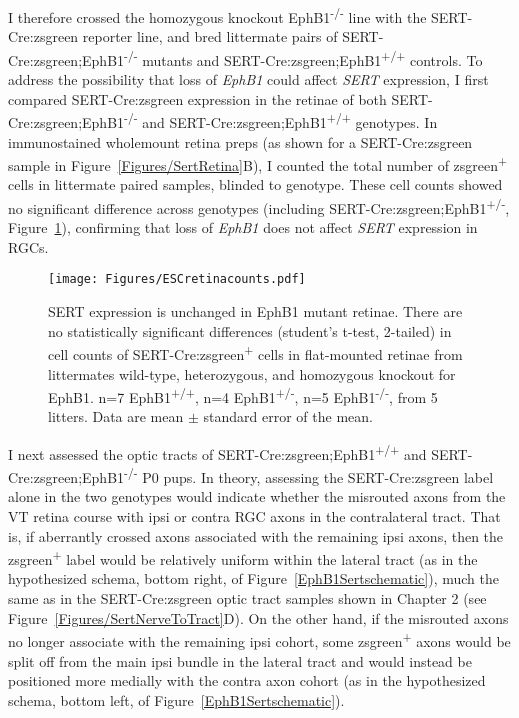 I therefore crossed the homozygous knockout EphB1\textsuperscript{-/-} line with the SERT-Cre:zsgreen reporter line, and bred littermate pairs of SERT-Cre:zsgreen;EphB1\textsuperscript{-/-} mutants and SERT-Cre:zsgreen;EphB1\textsuperscript{+/+} controls.
To address the possibility that loss of \emph{EphB1} could affect \emph{SERT} expression, I first compared SERT-Cre:zsgreen expression in the retinae of both SERT-Cre:zsgreen;EphB1\textsuperscript{-/-} and SERT-Cre:zsgreen;EphB1\textsuperscript{+/+} genotypes.
In immunostained wholemount retina preps (as shown for a SERT-Cre:zsgreen sample in Figure~\ref{Figures/SertRetina}B), I counted the total number of zsgreen\textsuperscript{+} cells in littermate paired samples, blinded to genotype.
These cell counts showed no significant difference across genotypes (including SERT-Cre:zsgreen;EphB1\textsuperscript{+/-}, Figure~\ref{ESCretinacounts}), confirming that loss of \emph{EphB1} does not affect \emph{SERT} expression in RGCs.
\begin{figure}[hbtp]
    \begin{center}
        \texttt{[image: Figures/ESCretinacounts.pdf]}
        \caption[SERT expression is unchanged in EphB1 mutant retinae.]
        {SERT expression is unchanged in EphB1 mutant retinae.
        There are no statistically significant differences (student's t-test, 2-tailed) in cell counts of SERT-Cre:zsgreen\textsuperscript{+} cells in flat-mounted retinae from littermates wild-type, heterozygous, and homozygous knockout for EphB1.
        n=7 EphB1\textsuperscript{+/+}, n=4 EphB1\textsuperscript{+/-}, n=5 EphB1\textsuperscript{-/-}, from 5 litters.
        Data are mean $\pm$ standard error of the mean.
        }
        \label{ESCretinacounts}
    \end{center}
\end{figure}

I next assessed the optic tracts of SERT-Cre:zsgreen;EphB1\textsuperscript{+/+} and SERT-Cre:zsgreen;EphB1\textsuperscript{-/-} P0 pups.
In theory, assessing the SERT-Cre:zsgreen label alone in the two genotypes would indicate whether the misrouted axons from the VT retina course with ipsi or contra RGC axons in the contralateral tract.
That is, if aberrantly crossed axons associated with the remaining ipsi axons, then the zsgreen\textsuperscript{+} label would be relatively uniform within the lateral tract (as in the hypothesized schema, bottom right, of Figure~\ref{EphB1Sertschematic}), much the same as in the SERT-Cre:zsgreen optic tract samples shown in Chapter 2 (see Figure~\ref{Figures/SertNerveToTract}D).
On the other hand, if the misrouted axons no longer associate with the remaining ipsi cohort, some zsgreen\textsuperscript{+} axons would be split off from the main ipsi bundle in the lateral tract and would instead be positioned more medially with the contra axon cohort (as in the hypothesized schema, bottom left, of Figure~\ref{EphB1Sertschematic}).

